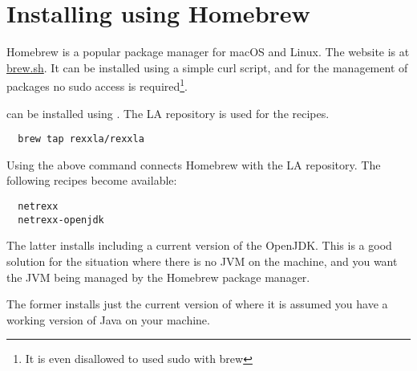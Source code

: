 \section{Installing using Homebrew}

Homebrew is a popular package manager for macOS and Linux. The website
is at \url{brew.sh}. It can be installed using a simple curl script,
and for the management of packages no sudo access is
required\footnote{It is even disallowed to used sudo with brew}.

\nr{} can be installed using . The \rexx{}LA repository is
used for the \nr{} recipes.

\begin{lstlisting}
  brew tap rexxla/rexxla
\end{lstlisting}

Using the above  command connects Homebrew with the
\rexx{}LA repository. The following recipes become available:

\begin{lstlisting}
  netrexx
  netrexx-openjdk
\end{lstlisting}

The latter installs \nr{} including a current version of the
OpenJDK. This is a good solution for the situation where there is no
JVM on the machine, and you want the JVM being managed by the Homebrew
package manager.

The former installs just the current version of \nr{} where it is
assumed you have a working version of Java on your machine.

